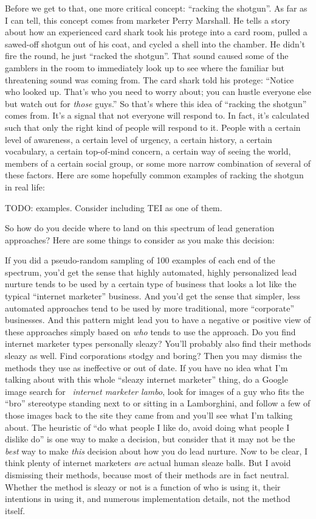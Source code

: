 Before we get to that, one more critical concept: ``racking the shotgun''. As far as I can tell, this concept comes from marketer Perry Marshall. He tells a story about how an experienced card shark took his protege into a card room, pulled a sawed-off shotgun out of his coat, and cycled a shell into the chamber. He didn't fire the round, he just ``racked the shotgun''. That sound caused some of the gamblers in the room to immediately look up to see where the familiar but threatening sound was coming from. The card shark told his protege: ``Notice who looked up. That's who you need to worry about; you can hustle everyone else but watch out for \emph{those} guys.'' So that's where this idea of “racking the shotgun'' comes from. It's a signal that not everyone will respond to. In fact, it's calculated such that only the right kind of people will respond to it. People with a certain level of awareness, a certain level of urgency, a certain history, a certain vocabulary, a certain top-of-mind concern, a certain way of seeing the world, members of a certain social group, or some more narrow combination of several of these factors. Here are some hopefully common examples of racking the shotgun in real life:

TODO: examples. Consider including TEI as one of them.

So how do you decide where to land on this spectrum of lead generation approaches? Here are some things to consider as you make this decision:

If you did a pseudo-random sampling of 100 examples of each end of the spectrum, you'd get the sense that highly automated, highly personalized lead nurture tends to be used by a certain type of business that looks a lot like the typical ``internet marketer'' business. And you'd get the sense that simpler, less automated approaches tend to be used by more traditional, more ``corporate'' businesses. And this pattern might lead you to have a negative or positive view of these approaches simply based on \emph{who} tends to use the approach. Do you find internet marketer types personally sleazy? You'll probably also find their methods sleazy as well. Find corporations stodgy and boring? Then you may dismiss the methods they use as ineffective or out of date. If you have no idea what I'm talking about with this whole ``sleazy internet marketer'' thing, do a Google image search for \emph{ internet marketer lambo}, look for images of a guy who fits the ``bro'' stereotype standing next to or sitting in a Lamborghini, and follow a few of those images back to the site they came from and you'll see what I'm talking about. The heuristic of ``do what people I like do, avoid doing what people I dislike do'' is one way to make a decision, but consider that it may not be the \emph{best} way to make \emph{this} decision about how you do lead nurture. Now to be clear, I think plenty of internet marketers \emph{are} actual human sleaze balls. But I avoid dismissing their methods, because most of their methods are in fact neutral. Whether the method is sleazy or not is a function of who is using it, their intentions in using it, and numerous implementation details, not the method itself.

